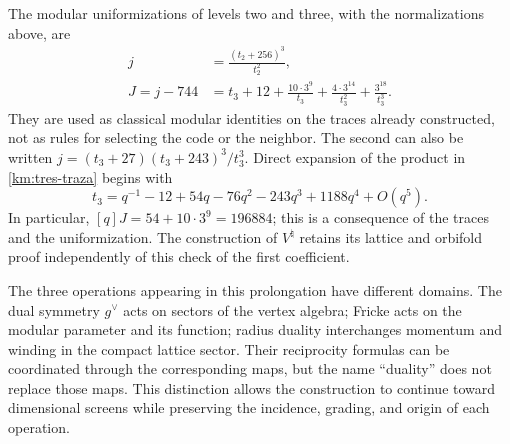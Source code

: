 The modular uniformizations of levels two and three, with the
normalizations above, are
\begin{align}
 j&=\frac{(t_2+256)^3}{t_2^2},
 \label{km:j-nivel2}\\
 J=j-744
 &=t_3+12+\frac{10\cdot3^9}{t_3}
       +\frac{4\cdot3^{14}}{t_3^2}
       +\frac{3^{18}}{t_3^3}.
 \label{km:j-nivel3}
\end{align}
They are used as classical modular identities on the traces already
constructed, not as rules for selecting the code or the neighbor.
The second can also be written
\(j=(t_3+27)(t_3+243)^3/t_3^3\).
Direct expansion of the product in \eqref{km:tres-traza} begins with
\[
 t_3=q^{-1}-12+54q-76q^2-243q^3+1188q^4+O(q^5).
\]
In particular, \([q]J=54+10\cdot3^9=196884\); this is a
consequence of the traces and the uniformization. The construction of
\(V^\natural\) retains its lattice and orbifold proof independently
of this check of the first coefficient.





The three operations appearing in this prolongation have different
domains. The dual symmetry \(g^\vee\) acts on sectors of the vertex
algebra; Fricke acts on the modular parameter and its function; radius
duality interchanges momentum and winding in the compact lattice
sector. Their reciprocity formulas can be coordinated through the
corresponding maps, but the name ``duality'' does not replace those
maps. This distinction allows the construction to continue toward
dimensional screens while preserving the incidence, grading, and origin
of each operation.
